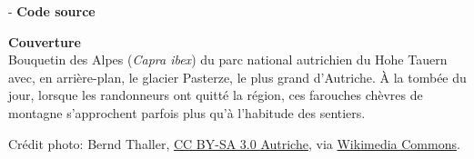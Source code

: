 \begin{adjustwidth*}{\unitlength}{-\unitlength}
  \textbf{Code source} \\
  \viewsource{\ghurl}

  \textbf{Couverture} \\
  Bouquetin des Alpes (\emph{Capra ibex}) du parc national autrichien
  du Hohe Tauern avec, en arrière-plan, le glacier Pasterze, le plus
  grand d'Autriche. À la tombée du jour, lorsque les randonneurs ont
  quitté la région, ces farouches chèvres de montagne s'approchent
  parfois plus qu'à l'habitude des sentiers.

  Crédit photo: {\textcopyright} Bernd Thaller,
  \href{https://creativecommons.org/licenses/by-sa/3.0/at/deed.en}{CC
    BY-SA 3.0 Autriche}, via
  \href{https://commons.wikimedia.org/w/index.php?curid=40071439}{Wikimedia
    Commons}.
\end{adjustwidth*}
\endgroup

